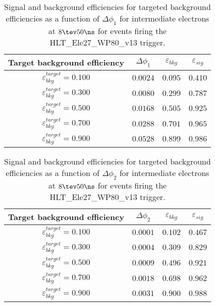 \clearpage

\begin{table}[!bht]
  \begin{center}
    \begin{tabular}{cccc}
      \hline
      Target background efficiency & $\Delta\phi_1$ & $\varepsilon_{bkg}$ & $\varepsilon_{sig}$ \\ 
      \hline
      $\varepsilon_{bkg}^{target} = 0.100$ & $  0.0024$ & $0.095$ & $0.410$ \\
      $\varepsilon_{bkg}^{target} = 0.300$ & $  0.0080$ & $0.299$ & $0.787$ \\
      $\varepsilon_{bkg}^{target} = 0.500$ & $  0.0168$ & $0.505$ & $0.925$ \\
      $\varepsilon_{bkg}^{target} = 0.700$ & $  0.0288$ & $0.701$ & $0.965$ \\
      $\varepsilon_{bkg}^{target} = 0.900$ & $  0.0528$ & $0.899$ & $0.986$ \\
      \hline
    \end{tabular}
    \caption{Signal and background efficiencies for targeted background efficiencies as a function of $\Delta\phi_1$ for intermediate electrons at $8\tev 50\ns$ for events firing the HLT\_Ele27\_WP80\_v13 trigger.}
    \label{tab:eff_rej_phi1_beam_8_50_trigger_27_I}
  \end{center}
\end{table}

\clearpage

\begin{table}[!bht]
  \begin{center}
    \begin{tabular}{cccc}
      \hline
      Target background efficiency & $\Delta\phi_2$ & $\varepsilon_{bkg}$ & $\varepsilon_{sig}$ \\ 
      \hline
      $\varepsilon_{bkg}^{target} = 0.100$ & $  0.0001$ & $0.102$ & $0.467$ \\
      $\varepsilon_{bkg}^{target} = 0.300$ & $  0.0004$ & $0.309$ & $0.829$ \\
      $\varepsilon_{bkg}^{target} = 0.500$ & $  0.0009$ & $0.496$ & $0.921$ \\
      $\varepsilon_{bkg}^{target} = 0.700$ & $  0.0018$ & $0.698$ & $0.962$ \\
      $\varepsilon_{bkg}^{target} = 0.900$ & $  0.0031$ & $0.900$ & $0.988$ \\
      \hline
    \end{tabular}
    \caption{Signal and background efficiencies for targeted background efficiencies as a function of $\Delta\phi_2$ for intermediate electrons at $8\tev 50\ns$ for events firing the HLT\_Ele27\_WP80\_v13 trigger.}
    \label{tab:eff_rej_phi2_beam_8_50_trigger_27_I}
  \end{center}
\end{table}

